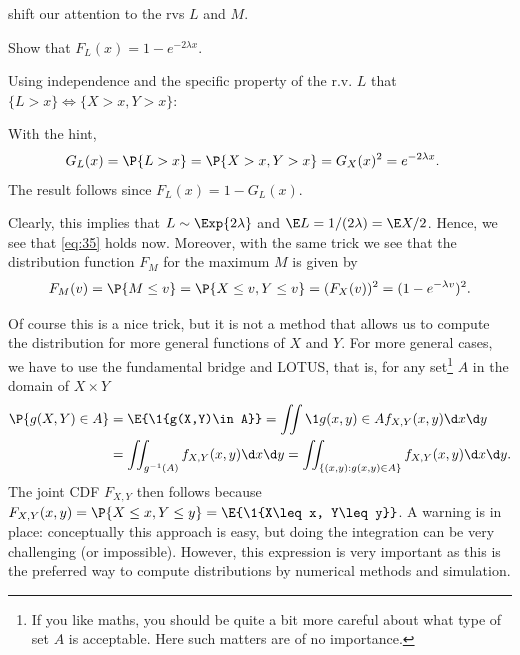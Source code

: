 \documentclass[a4paper]{article}
\begin{document}
 shift our attention to the rvs \(L\) and \(M\).


\begin{exercise}
Show that \(F_L(x) = 1-e^{-2\lambda x}\).
\begin{hint}
Using independence and the specific property of the r.v. \(L\) that \(\{L>x\} \iff \{X>x, Y>x\}\):
\end{hint}
\begin{solution}
With the hint,
 \begin{align*}
G_L(x) = \P{L>x}  &= \P{X>x, Y> x} = G_X(x)^{2} = e^{-2\lambda x}.
  \end{align*}
The result follows since  \(F_{L}(x) = 1-G_{L}(x)\).
\end{solution}
\end{exercise}

Clearly, this implies that  \(L\sim \Exp{2\lambda}\) and \(\E L = 1/(2\lambda) = \E X /2\). Hence, we see that \cref{eq:35} holds now.
Moreover, with the same trick we see  that the distribution function \(F_{M}\) for the maximum \(M\) is given by
\begin{equation*}
F_{M}(v) = \P{M\leq v}   = \P{X \leq v, Y \leq v} = (F_{X}(v))^{2} = (1-e^{-\lambda v})^{2}.
\end{equation*}


Of course this is a nice trick, but it is not a method that allows us to compute the distribution for more general functions of \(X\) and \(Y\).
For more general cases, we have to use the fundamental bridge and LOTUS, that is,
for any set\footnote{If you like maths, you should be quite a bit more careful about what type of set \(A\) is acceptable. Here such matters are of no importance.} \(A\) in the domain of \(X \times Y\)
  \begin{equation*}
    \begin{split}
\P{g(X, Y) \in A}
&= \E{\1{g(X,Y)\in A}}
= \iint \1{g(x,y) \in A} f_{X,Y}(x,y) \d x \d y \\
&= \iint_{g^{-1}(A)} f_{X,Y}(x, y) \d x \d y
= \iint_{\{(x,y): g(x,y) \in A\}} f_{X,Y}(x,y) \d x \d y.
    \end{split}
  \end{equation*}
The joint CDF \(F_{X,Y}\) then follows because \(F_{X,Y}(x,y) = \P{X\leq x, Y\leq y} = \E{\1{X\leq x, Y\leq y}}\).
A warning is in place: conceptually this approach is easy, but doing  the integration can be very challenging (or impossible).  However, this expression is very important as this is the preferred way to compute distributions by numerical methods and simulation.
\end{document}
